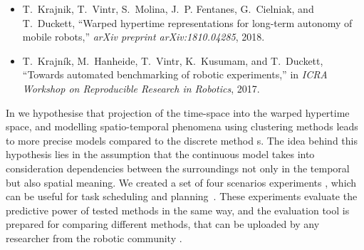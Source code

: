 \begin{itemize}
    \item T.~Krajnik, T.~Vintr, S.~Molina, J.~P. Fentanes, G.~Cielniak, and T.~Duckett, ``Warped hypertime representations for long-term autonomy of mobile robots,'' \emph{arXiv preprint arXiv:1810.04285}, 2018.
    \item T.~Krajn{\'i}k, M.~Hanheide, T.~Vintr, K.~Kusumam, and T.~Duckett, ``Towards automated benchmarking of robotic experiments,'' in \emph{ICRA Workshop on  Reproducible Research in Robotics}, 2017.
\end{itemize}

In \cite{krajnik2018warped} we hypothesise that projection of the time-space into the warped hypertime space, and modelling spatio-temporal phenomena using clustering methods leads to more precise models compared to the discrete method
s.
The idea behind this hypothesis lies in the assumption that the continuous model takes into consideration dependencies between
 the surroundings not only in the temporal \cite{tipaldi2013lifelong,rosen2016towards,kucner2013conditional,krajnik2017fremen} but also spatial meaning.
We created a set of four scenarios experiments \cite{krajnik2017towards}, which can be useful for task scheduling and planning~\cite{mudrova2015integrated}.
These experiments evaluate the predictive power of tested methods in the same way, and the evaluation tool is prepared for
 comparing different methods, that can be uploaded by any researcher from the robotic community \cite{krajnik2017towards}.

